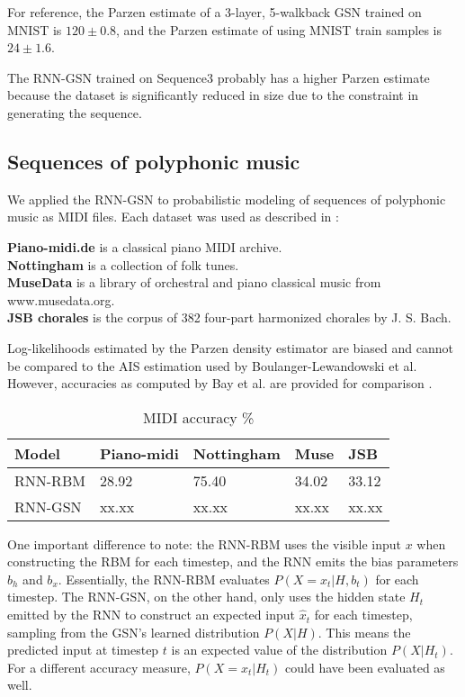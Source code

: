 For reference, the Parzen estimate of a 3-layer, 5-walkback GSN trained on MNIST is $120 \pm 0.8$, and the Parzen estimate of using MNIST train samples is $24 \pm 1.6$.

The RNN-GSN trained on Sequence3 probably has a higher Parzen estimate because the dataset is significantly reduced in size due to the constraint in generating the sequence.

\subsection{Sequences of polyphonic music}
	We applied the RNN-GSN to probabilistic modeling of sequences of polyphonic music as MIDI files. Each dataset was used as described in \cite{rnnrbm}:

\textbf{Piano-midi.de} is a classical piano MIDI archive.\\
\textbf{Nottingham} is a collection of folk tunes.\\
\textbf{MuseData} is a library of orchestral and piano classical music from www.musedata.org.\\
\textbf{JSB chorales} is the corpus of 382 four-part harmonized chorales by J. S. Bach.
	
Log-likelihoods estimated by the Parzen density estimator are biased and cannot be compared to the AIS estimation used by Boulanger-Lewandowski et al. However, accuracies as computed by Bay et al. are provided for comparison \cite{bay}.

\begin {table}[H]
 \caption {MIDI accuracy \%} \label{tab:midi}
\begin{tabular}{l | l l l l}
\hline
Model & Piano-midi & Nottingham & Muse & JSB\\
\hline
RNN-RBM & 28.92 & 75.40 & 34.02 & 33.12\\
RNN-GSN  & xx.xx  & xx.xx  & xx.xx  & xx.xx\\
\hline
\end{tabular}
\end{table}

One important difference to note: the RNN-RBM uses the visible input $x$ when constructing the RBM for each timestep, and the RNN emits the bias parameters $b_h$ and $b_x$. Essentially, the RNN-RBM evaluates $P(X=x_t|H,b_t)$ for each timestep.
The RNN-GSN, on the other hand, only uses the hidden state $H_t$ emitted by the RNN to construct an expected input $\hat{x}_t$ for each timestep, sampling from the GSN's learned distribution $P(X|H)$. This means the predicted input at timestep $t$ is an expected value of the distribution $P(X|H_t)$. For a different accuracy measure, $P(X=x_t|H_t)$ could have been evaluated as well.
